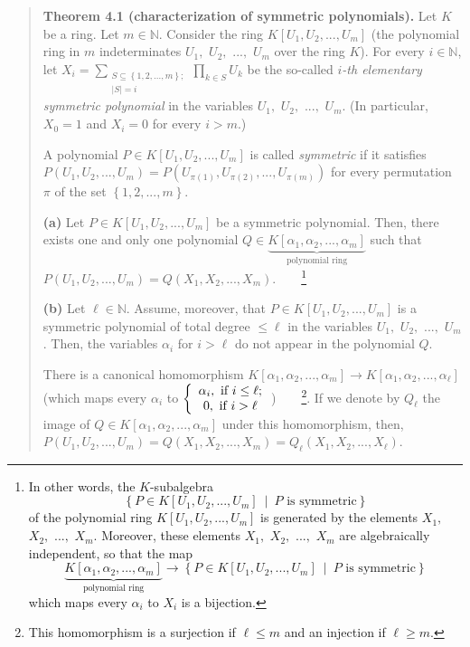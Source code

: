 \documentclass[numbers=enddot,12pt,final,onecolumn,notitlepage]{scrartcl}%
\begin{document}
\begin{quote}
\textbf{Theorem 4.1 (characterization of symmetric polynomials).} Let $K$ be a
ring. Let $m\in\mathbb{N}$. Consider the ring $K\left[  U_{1},U_{2}%
,...,U_{m}\right]  $ (the polynomial ring in $m$ indeterminates $U_{1},$
$U_{2},$ $...,$ $U_{m}$ over the ring $K$). For every $i\in\mathbb{N}$, let
$X_{i}=\sum\limits_{\substack{S\subseteq\left\{  1,2,...,m\right\}
;\\\left\vert S\right\vert =i}}\prod\limits_{k\in S}U_{k}$ be the so-called
$i$\textit{-th elementary symmetric polynomial} in the variables $U_{1},$
$U_{2},$ $...,$ $U_{m}$. (In particular, $X_{0}=1$ and $X_{i}=0$ for every
$i>m$.)

A polynomial $P\in K\left[  U_{1},U_{2},...,U_{m}\right]  $ is called
\textit{symmetric} if it satisfies $P\left(  U_{1},U_{2},...,U_{m}\right)
=P\left(  U_{\pi\left(  1\right)  },U_{\pi\left(  2\right)  },...,U_{\pi
\left(  m\right)  }\right)  $ for every permutation $\pi$ of the set $\left\{
1,2,...,m\right\}  $.

\textbf{(a)} Let $P\in K\left[  U_{1},U_{2},...,U_{m}\right]  $ be a symmetric
polynomial. Then, there exists one and only one polynomial $Q\in
\underbrace{K\left[  \alpha_{1},\alpha_{2},...,\alpha_{m}\right]
}_{\text{polynomial ring}}$ such that $P\left(  U_{1},U_{2},...,U_{m}\right)
=Q\left(  X_{1},X_{2},...,X_{m}\right)  $.\ \ \ \ \footnote{In other words,
the $K$-subalgebra%
\[
\left\{  P\in K\left[  U_{1},U_{2},...,U_{m}\right]  \ \mid\ P\text{ is
symmetric}\right\}
\]
of the polynomial ring $K\left[  U_{1},U_{2},...,U_{m}\right]  $ is generated
by the elements $X_{1},$ $X_{2},$ $...,$ $X_{m}$. Moreover, these elements
$X_{1},$ $X_{2},$ $...,$ $X_{m}$ are algebraically independent, so that the
map%
\[
\underbrace{K\left[  \alpha_{1},\alpha_{2},...,\alpha_{m}\right]
}_{\text{polynomial ring}}\rightarrow\left\{  P\in K\left[  U_{1}%
,U_{2},...,U_{m}\right]  \ \mid\ P\text{ is symmetric}\right\}
\]
which maps every $\alpha_{i}$ to $X_{i}$ is a bijection.}

\textbf{(b)} Let $\ell\in\mathbb{N}$. Assume, moreover, that $P\in K\left[
U_{1},U_{2},...,U_{m}\right]  $ is a symmetric polynomial of total degree
$\leq\ell$ in the variables $U_{1},$ $U_{2},$ $...,$ $U_{m}$. Then, the
variables $\alpha_{i}$ for $i>\ell$ do not appear in the polynomial $Q$.

There is a canonical homomorphism $K\left[  \alpha_{1},\alpha_{2}%
,...,\alpha_{m}\right]  \rightarrow K\left[  \alpha_{1},\alpha_{2}%
,...,\alpha_{\ell}\right]  $ (which maps every $\alpha_{i}$ to $\left\{
\begin{array}
[c]{c}%
\alpha_{i},\text{ if }i\leq\ell;\\
0,\text{ if }i>\ell
\end{array}
\right.  $)\ \ \ \ \footnote{This homomorphism is a surjection if $\ell\leq m$
and an injection if $\ell\geq m$.}. If we denote by $Q_{\ell}$ the image of
$Q\in K\left[  \alpha_{1},\alpha_{2},...,\alpha_{m}\right]  $ under this
homomorphism, then, $P\left(  U_{1},U_{2},...,U_{m}\right)  =Q\left(
X_{1},X_{2},...,X_{m}\right)  =Q_{\ell}\left(  X_{1},X_{2},...,X_{\ell
}\right)  $.
\end{quote}
\end{document}
